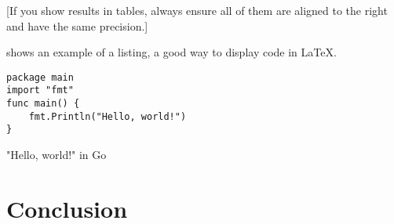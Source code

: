 [If you show results in tables, always ensure all of them are aligned to the right and have the same precision.]

 shows an example of a listing, a good way to display code in \LaTeX.

\begin{listing}[th]
	\begin{verbatim}
package main
import "fmt"
func main() {
    fmt.Println("Hello, world!")
}
	\end{verbatim}
\caption{"Hello, world!" in Go}
\label{lst:hello}
\end{listing}

\section{Conclusion}
\lipsum[2]
